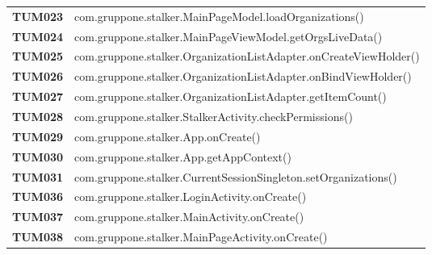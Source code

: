 \documentclass[../../piano-di-qualifica.tex]{subfiles}
\begin{document}
\begin{longtable}[H]{>{\centering\bfseries}m{3cm} >{}m{13cm}}
  TUM023             & com.gruppone.stalker.MainPageModel.loadOrganizations\@()                                                \\

  TUM024             & com.gruppone.stalker.MainPageViewModel.getOrgsLiveData\@()                                              \\

  TUM025             & com.gruppone.stalker.OrganizationListAdapter.onCreateViewHolder\@()                                     \\

  TUM026             & com.gruppone.stalker.OrganizationListAdapter.onBindViewHolder\@()                                       \\

  TUM027             & com.gruppone.stalker.OrganizationListAdapter.getItemCount\@()                                           \\

  TUM028             & com.gruppone.stalker.StalkerActivity.checkPermissions\@()                                               \\



  TUM029             & com.gruppone.stalker.App.onCreate\@()                                                                   \\

  TUM030             & com.gruppone.stalker.App.getAppContext\@()                                                              \\

  TUM031             & com.gruppone.stalker.CurrentSessionSingleton.setOrganizations\@()                                       \\


  TUM036             & com.gruppone.stalker.LoginActivity.onCreate\@()                                                         \\

  TUM037             & com.gruppone.stalker.MainActivity.onCreate\@()                                                          \\

  TUM038             & com.gruppone.stalker.MainPageActivity.onCreate\@()                                                      \\


\end{longtable}
\end{document}
